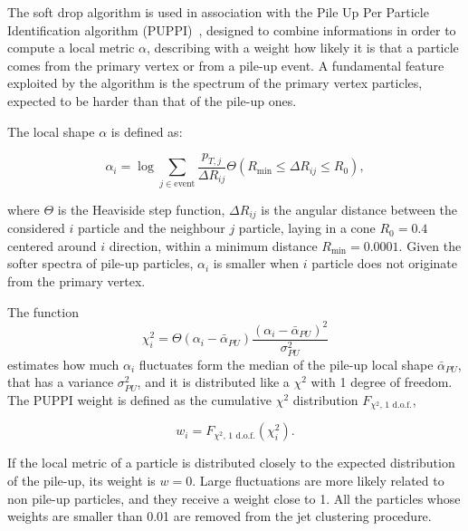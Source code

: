 \vspace*{1\baselineskip}

\noindent The soft drop algorithm is used in association with the Pile Up Per Particle Identification algorithm (PUPPI)~\cite{Bertolini2014}, designed to combine informations in order to compute a local metric $\alpha$, describing with a weight how likely it is that a particle comes from the primary vertex or from a pile-up event. A fundamental feature exploited by the algorithm is the \pt spectrum of the primary vertex particles, expected to be harder than that of the pile-up ones.

\noindent The local shape $\alpha$ is defined as:

\begin{equation}
\alpha_i = \log{ \sum_{j \in \text{event}} \frac{p_{T,j}}{\Delta R_{ij}} \Theta \left( R_{\text{min}} \leq \Delta R_{ij} \leq R_0 \right)},
\label{eq:puppi_shape_def}
\end{equation}

\noindent where $\Theta$ is the Heaviside step function, $\Delta R_{ij}$ is the angular distance between the considered $i$ particle and the neighbour $j$ particle, laying  in a cone $R_0 = 0.4$ centered around $i$ direction, within a minimum distance $R_{\text{min}} = 0.0001$. Given the softer \pt spectra of pile-up particles, $\alpha_i$ is smaller when $i$ particle does not originate from the primary vertex.

\noindent The function
\begin{equation}
\chi_i^2 = \Theta (\alpha_i - \bar{\alpha}_{PU}) \frac{\left(  \alpha_i -  \bar{\alpha}_{PU}  \right)^2}{\sigma^2_{PU}}
\label{eq:puppi_chi2}
\end{equation}
\noindent estimates how much $\alpha_i$ fluctuates form the median of the pile-up local shape $\bar{\alpha}_{PU}$, that has a variance $\sigma^2_{PU}$, and it is distributed like a $\chi^2$ with 1 degree of freedom. The PUPPI weight is defined as the cumulative $\chi^2$ distribution $F_{\chi^2\text{, 1 d.o.f.}}$,

\begin{equation}
w_i = F_{\chi^2\text{, 1 d.o.f.}} (\chi_i^2).
\label{eq:puppi_weight}
\end{equation}

\noindent If the local metric of a particle is distributed closely to the expected distribution of the pile-up, its weight is $w=0$. Large fluctuations are more likely related to non pile-up particles, and they receive a weight close to 1.  All the particles whose weights are smaller than 0.01 are removed from the jet clustering procedure.

